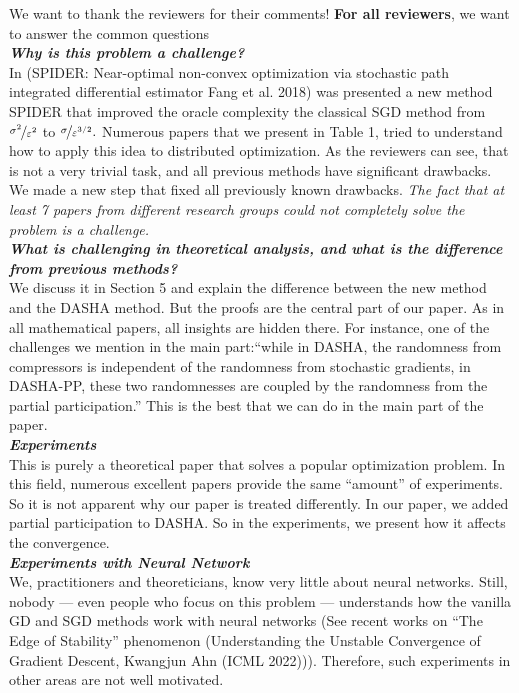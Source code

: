 \documentclass{article}
\begin{document}
We want to thank the reviewers for their comments! \textbf{For all reviewers}, we want to answer the common questions \\
\textbf{\textit{Why is this problem a challenge?}} \\
In (SPIDER: Near-optimal non-convex optimization via stochastic path integrated differential estimator 
Fang et al. 2018) was presented a new method SPIDER that improved the oracle complexity the classical SGD method from $\nicefrac{\sigma^2}{\varepsilon^2}$ to $\nicefrac{\sigma}{\varepsilon^{3/2}}.$ Numerous papers that we present in Table 1, tried to understand how to apply this idea to distributed optimization. As the reviewers can see, that is not a very trivial task, and all previous methods have significant drawbacks. We made a new step that fixed all previously known drawbacks. \emph{The fact that at least 7 papers from different research groups could not completely solve the problem is a challenge.} \\
\textbf{\textit{What is challenging in theoretical analysis, and what is the difference from previous methods?}} \\
We discuss it in Section 5 and explain the difference between the new method and the DASHA method. But the proofs are the central part of our paper. As in all mathematical papers, all insights are hidden there. For instance, one of the challenges we mention in the main part:``while in DASHA, the randomness from compressors is independent of the randomness from stochastic gradients, in DASHA-PP, these two randomnesses are coupled by the randomness from the partial participation.'' This is the best that we can do in the main part of the paper. \\
\textbf{\textit{Experiments}}\\
This is purely a theoretical paper that solves a popular optimization problem. In this field, numerous excellent papers provide the same ``amount'' of experiments. So it is not apparent why our paper is treated differently. In our paper, we added partial participation to DASHA. So in the experiments, we present how it affects the convergence. \\
\textbf{\textit{Experiments with Neural Network}} \\
We, practitioners and theoreticians, know very little about neural networks. Still, nobody --- even people who focus on this problem --- understands how the vanilla GD and SGD methods work with neural networks (See recent works on ``The Edge of Stability'' phenomenon (Understanding the Unstable Convergence of Gradient Descent, Kwangjun Ahn (ICML 2022))). Therefore, such experiments in other areas are not well motivated. \\
\end{document}
